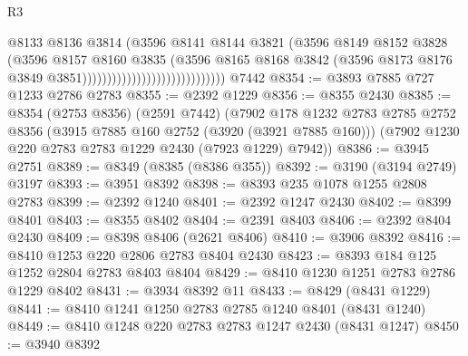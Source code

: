 \begin{lexlean}{R3}
\begin{coremodule}
                                                    @8133
                                                    @8136
                                                    @3814
                                                    (@3596
                                                      @8141
                                                      @8144
                                                      @3821
                                                      (@3596
                                                        @8149
                                                        @8152
                                                        @3828
                                                        (@3596
                                                          @8157
                                                          @8160
                                                          @3835
                                                          (@3596
                                                            @8165
                                                            @8168
                                                            @3842
                                                            (@3596
                                                              @8173
                                                              @8176
                                                              @3849
                                                              @3851)))))))))))))))))))))))))))))
    @7442
@8354 := @3893 @7885 @727 @1233 @2786 @2783
@8355 := @2392 @1229
@8356 := @8355 @2430
@8385 := @8354
    (@2753 @8356)
    (@2591 @7442)
    (@7902
      @178
      @1232
      @2783
      @2785
      @2752
      @8356
      (@3915 @7885 @160 @2752 (@3920 (@3921 @7885 @160)))
      (@7902 @1230 @220 @2783 @2783 @1229 @2430 (@7923 @1229) @7942))
@8386 := @3945 @2751
@8389 := @8349 (@8385 (@8386 @355))
@8392 := @3190 (@3194 @2749) @3197
@8393 := @3951 @8392
@8398 := @8393 @235 @1078 @1255 @2808 @2783
@8399 := @2392 @1240
@8401 := @2392 @1247 @2430
@8402 := @8399 @8401
@8403 := @8355 @8402
@8404 := @2391 @8403
@8406 := @2392 @8404 @2430
@8409 := @8398 @8406 (@2621 @8406)
@8410 := @3906 @8392
@8416 := @8410 @1253 @220 @2806 @2783 @8404 @2430
@8423 := @8393 @184 @125 @1252 @2804 @2783 @8403 @8404
@8429 := @8410 @1230 @1251 @2783 @2786 @1229 @8402
@8431 := @3934 @8392 @11
@8433 := @8429 (@8431 @1229)
@8441 := @8410 @1241 @1250 @2783 @2785 @1240 @8401 (@8431 @1240)
@8449 := @8410 @1248 @220 @2783 @2783 @1247 @2430 (@8431 @1247)
@8450 := @3940 @8392

\end{coremodule}
\end{lexlean}

